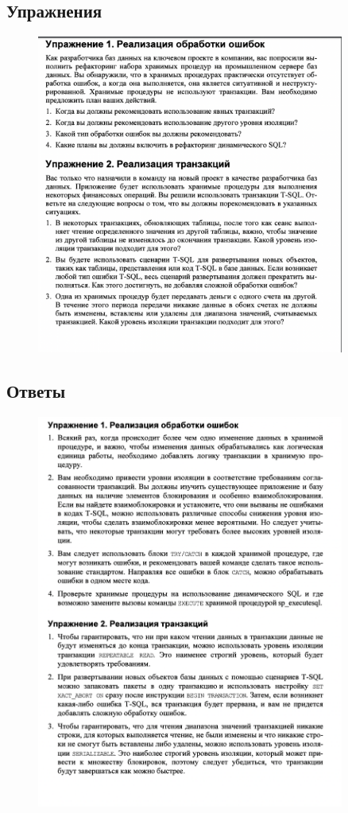 \newpage
\subsection*{Упражнения}

\begin{figure}[h!]
	\begin{center}
		\includegraphics[width=0.9\textwidth]{img/ex21.png}
	\end{center}
	\captionsetup{justification=centering}
\end{figure}

\subsection*{Ответы}

\begin{figure}[h!]
	\begin{center}
		\includegraphics[width=0.9\textwidth]{img/eans21.png}
	\end{center}
	\captionsetup{justification=centering}
\end{figure}